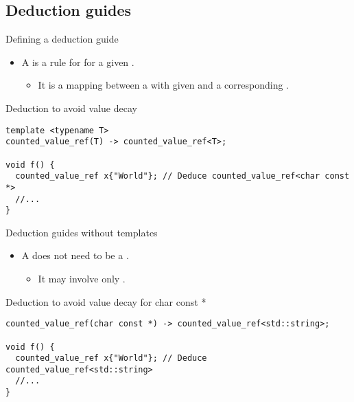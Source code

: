 \subsection{Deduction guides}

\begin{frame}[t,fragile]{Defining a deduction guide}
\begin{itemize}
  \item A  is a rule for  
        for a given .
    \begin{itemize}
      \item It is a mapping between a  with given 
             and a corresponding .
    \end{itemize}
\end{itemize}

\begin{block}{Deduction to avoid value decay}
\begin{lstlisting}
template <typename T>
counted_value_ref(T) -> counted_value_ref<T>;

void f() {
  counted_value_ref x{"World"}; // Deduce counted_value_ref<char const *>
  //...
}
\end{lstlisting}
\end{block}
\end{frame}

\begin{frame}[t,fragile]{Deduction guides without templates}
\begin{itemize}
  \item A  does not need to be 
        a .
    \begin{itemize}
      \item It may involve only .
    \end{itemize}
\end{itemize}

\begin{block}{Deduction to avoid value decay for char const *}
\begin{lstlisting}
counted_value_ref(char const *) -> counted_value_ref<std::string>;

void f() {
  counted_value_ref x{"World"}; // Deduce counted_value_ref<std::string>
  //...
}
\end{lstlisting}
\end{block}
\end{frame}

